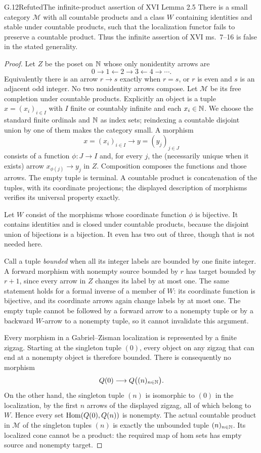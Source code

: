 \begin{claim}{G.12}{Refuted}{The infinite-product assertion of XVI Lemma 2.5}
\label{G:infinite-product-counterexample}
There is a small category $\mathcal M$ with all countable products
and a class $W$ containing identities and stable under countable
products, such that the localization functor fails to preserve a
countable product.  Thus the infinite assertion of XVI ms.~7--16
is false in the stated generality.
\end{claim}
\begin{proof}
Let $Z$ be the poset on $\mathbb N$ whose only nonidentity arrows are
\[
 0\to1\leftarrow2\to3\leftarrow4\to\cdots.
\]
Equivalently there is an arrow $r\to s$ exactly when $r=s$, or
$r$ is even and $s$ is an adjacent odd integer.  No two nonidentity
arrows compose.  Let $\mathcal M$ be its free completion under
countable products.  Explicitly an object is a tuple
$x=(x_i)_{i\in I}$ with $I$ finite or countably infinite and each
$x_i\in\mathbb N$.  We choose the standard finite ordinals and $\mathbb N$ as
index sets; reindexing a countable disjoint union by one of them
makes the category small.  A morphism
\[
 x=(x_i)_{i\in I}\longrightarrow y=(y_j)_{j\in J}
\]
consists of a function $\phi:J\to I$ and, for every $j$, the
(necessarily unique when it exists) arrow $x_{\phi(j)}\to y_j$
in $Z$.  Composition composes the functions and those arrows.
The empty tuple is terminal.  A countable product is concatenation
of the tuples, with its coordinate projections; the displayed
description of morphisms verifies its universal property exactly.

Let $W$ consist of the morphisms whose coordinate function $\phi$
is bijective.  It contains identities and is closed under countable
products, because the disjoint union of bijections is a bijection.
It even has two out of three, though that is not needed here.

Call a tuple \emph{bounded} when all its integer labels are bounded
by one finite integer.  A forward morphism with nonempty source
bounded by $r$ has target bounded by $r+1$, since every arrow in
$Z$ changes its label by at most one.  The same statement holds
for a formal inverse of a member of $W$: its coordinate function
is bijective, and its coordinate arrows again change labels by
at most one.  The empty tuple cannot be followed by a forward
arrow to a nonempty tuple or by a backward $W$-arrow to a nonempty
tuple, so it cannot invalidate this argument.

Every morphism in a Gabriel--Zisman localization is represented
by a finite zigzag.  Starting at the singleton tuple $(0)$, every
object on any zigzag that can end at a nonempty object is therefore
bounded.  There is consequently no morphism
\[
 Q(0)\longrightarrow Q\bigl((n)_{n\in\mathbb N}\bigr).
\]
On the other hand, the singleton tuple $(n)$ is isomorphic to $(0)$
in the localization, by the first $n$ arrows of the displayed
zigzag, all of which belong to $W$.  Hence every set
$\operatorname{Hom}(Q(0),Q(n))$ is nonempty.  The actual countable product in
$\mathcal M$ of the singleton tuples $(n)$ is exactly the unbounded
tuple $(n)_{n\in\mathbb N}$.  Its localized cone cannot be a product:
the required map of hom sets has empty source and nonempty target.


\end{proof}
